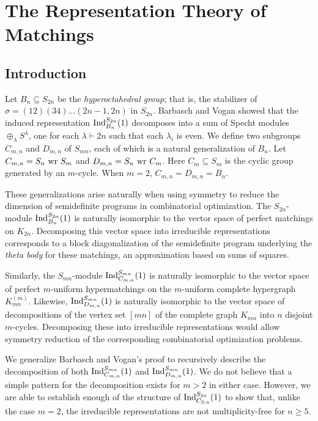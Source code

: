 
\chapter{The Representation Theory of Matchings}
\label{chap:matchings}

\section{Introduction} \label{BV:Introduction}
Let $B_n \subseteq S_{2n}$ be the {\em hyperoctahedral group}; that is, the stabilizer of $\sigma = (12)(34)\ldots (2n-1,2n)$ in $S_{2n}$. Barbasch and Vogan \cite{bv} showed that the induced representation $\textup{Ind}_{B_n}^{S_{2n}}(1)$ decomposes into a sum of Specht modules $\oplus_\lambda S^\lambda$, one for each $\lambda \vdash 2n$ such that each $\lambda_i$ is even.
We define two subgroups $C_{m,n}$ and $D_{m,n}$ of $S_{mn}$, each of which is a natural generalization of $B_n$. 
Let $C_{m,n} = S_n \textup{ wr } S_m$ and $D_{m,n} = S_n \textup{ wr } C_m$. Here $C_m \subseteq S_m$ is the cyclic group generated by an $m$-cycle. When $m=2$, $C_{m,n} = D_{m,n} = B_n$.

These generalizations arise naturally when using symmetry to reduce the dimension of semidefinite programs in combinatorial optimization. The $S_{2n}$-module $\textup{Ind}_{B_n}^{S_{2n}}(1)$ is naturally isomorphic to the vector space of perfect matchings on $K_{2n}$. Decomposing this vector space into irreducible representations corresponds to a block diagonalization of the semidefinite program underlying the {\em theta body} for these matchings, an approximation based on sums of squares.

Similarly, the $S_{mn}$-module $\textup{Ind}_{C_{m,n}}^{S_{mn}}(1)$ is naturally isomorphic to the vector space of perfect $m$-uniform hypermatchings on the $m$-uniform complete hypergraph $K^{(m)}_{mn}$. Likewise, $\textup{Ind}_{D_{m,n}}^{S_{mn}}(1)$ is naturally isomorphic to the vector space of decompositions of the vertex set $[mn]$ of the complete graph $K_{mn}$ into $n$ disjoint $m$-cycles. Decomposing these into irreducible representations would allow symmetry reduction of the corresponding combinatorial optimization problems.

We generalize Barbasch and Vogan's proof to recursively describe the decomposition of both $\textup{Ind}_{C_{m,n}}^{S_{mn}}(1)$ and $\textup{Ind}_{D_{m,n}}^{S_{mn}}(1)$. 
We do not believe that a simple pattern for the decomposition exists for $m > 2$ in either case.
However, we are able to establish enough of the structure of $\textup{Ind}_{C_{3,n}}^{S_{3n}}(1)$ to show that, unlike the case $m=2$,
the irreducible representations are not multiplicity-free for $n \ge 5$.

